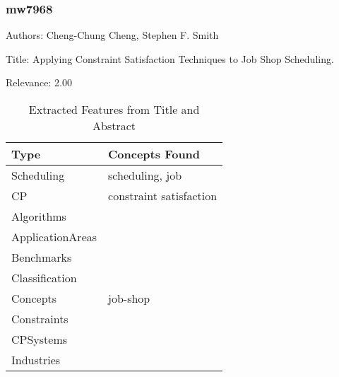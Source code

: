 \subsubsection{mw7968}
\label{mw:mw7968}

Authors: Cheng-Chung Cheng, Stephen F. Smith

Title: Applying Constraint Satisfaction Techniques to Job Shop Scheduling.

Relevance:  2.00

{\scriptsize
\begin{longtable}{p{2cm}p{20cm}}
\caption{Extracted Features from Title and Abstract}\\ \toprule
Type & Concepts Found\\ \midrule
\endhead
\bottomrule
\endfoot
Scheduling & scheduling, job\\ 
CP & constraint satisfaction\\ 
Algorithms & \\ 
ApplicationAreas & \\ 
Benchmarks & \\ 
Classification & \\ 
Concepts & job-shop\\ 
Constraints & \\ 
CPSystems & \\ 
Industries & \\ 
\end{longtable}
}



